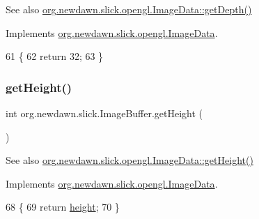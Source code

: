 \begin{DoxySeeAlso}{See also}
\mbox{\hyperlink{interfaceorg_1_1newdawn_1_1slick_1_1opengl_1_1_image_data_a69be40348e05222e8f0c65f5845adcb9}{org.\+newdawn.\+slick.\+opengl.\+Image\+Data\+::get\+Depth()}} 
\end{DoxySeeAlso}


Implements \mbox{\hyperlink{interfaceorg_1_1newdawn_1_1slick_1_1opengl_1_1_image_data_a69be40348e05222e8f0c65f5845adcb9}{org.\+newdawn.\+slick.\+opengl.\+Image\+Data}}.


\begin{DoxyCode}
61                           \{
62         \textcolor{keywordflow}{return} 32;
63     \}
\end{DoxyCode}
\mbox{\label{classorg_1_1newdawn_1_1slick_1_1_image_buffer_a658cb27b181a326ee4de313b08190411}} 
\subsubsection{\texorpdfstring{get\+Height()}{getHeight()}}
{\footnotesize\ttfamily int org.\+newdawn.\+slick.\+Image\+Buffer.\+get\+Height (\begin{DoxyParamCaption}{ }\end{DoxyParamCaption})\hspace{0.3cm}{\ttfamily [inline]}}

\begin{DoxySeeAlso}{See also}
\mbox{\hyperlink{interfaceorg_1_1newdawn_1_1slick_1_1opengl_1_1_image_data_acce23925ae561e75f051d3287a8dda06}{org.\+newdawn.\+slick.\+opengl.\+Image\+Data\+::get\+Height()}} 
\end{DoxySeeAlso}


Implements \mbox{\hyperlink{interfaceorg_1_1newdawn_1_1slick_1_1opengl_1_1_image_data_acce23925ae561e75f051d3287a8dda06}{org.\+newdawn.\+slick.\+opengl.\+Image\+Data}}.


\begin{DoxyCode}
68                            \{
69         \textcolor{keywordflow}{return} \mbox{\hyperlink{classorg_1_1newdawn_1_1slick_1_1_image_buffer_a3ddd231a45747a547db36fbd23ad426e}{height}};
70     \}
\end{DoxyCode}
\mbox{\label{classorg_1_1newdawn_1_1slick_1_1_image_buffer_a37a44b89c9d01300631b4368074b08d8}} 
